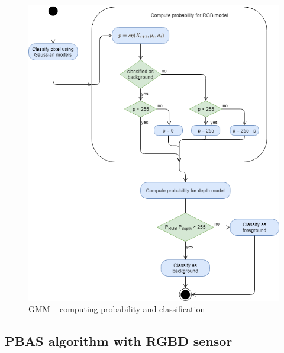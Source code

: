 \documentclass[b5paper,10pt,twoside]{article}
\begin{document}
{%


\begin{figure}[!t]
	\begin{center}
		\includegraphics[scale=0.50]{img/gmm_alg.png}
		\caption{GMM -- computing probability and classification}
		\label{fig:gmm_alg}
	\end{center}
\end{figure}

\subsection{PBAS algorithm with RGBD sensor}
\label{subsec:pbas_rgbd}

}
\end{document}
